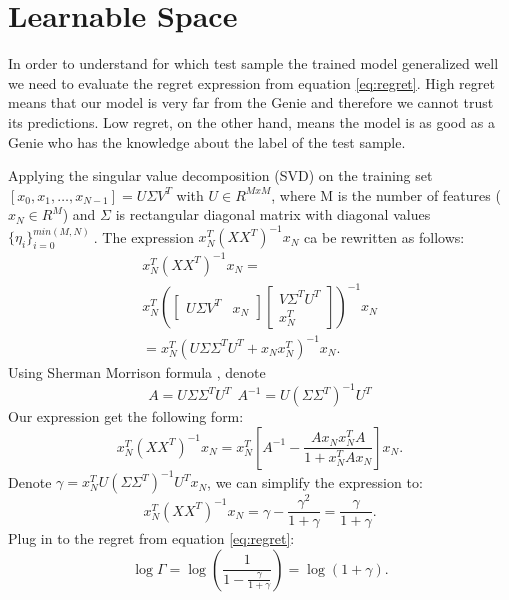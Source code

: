 \documentclass[conference,letterpaper]{IEEEtran}
\begin{document}
\section{Learnable Space} \label{sec:learnable_space}
In order to understand for which test sample the trained model generalized well we need to evaluate the regret expression from equation \ref{eq:regret}. High regret means that our model is very far from the Genie and therefore we cannot trust its predictions. Low regret, on the other hand, means the model is as good as a Genie who has the knowledge about the label of the test sample.

Applying the singular value decomposition (SVD) on the training set $[x_0,x_1, \hdots, x_{N-1}] = U \Sigma V^T$ with $U\in R^{MxM}$, where M is the number of features ($x_N \in R^M$) and $\Sigma$ is rectangular diagonal matrix with diagonal values $\{\eta_i\}_{i=0}^{min(M,N)} \ $. The expression $x_N^T(XX^T)^{-1}x_N$ ca be rewritten as follows:
\begin{multline}
x_N^T(XX^T)^{-1}x_N = \\
x_N^T\left(\begin{bmatrix} U \Sigma V^T & x_N \end{bmatrix}
\begin{bmatrix}
V \Sigma^T U^T \\ x_N^T
\end{bmatrix}
\right)^{-1}x_N \\
=  x_N^T\left(U \Sigma \Sigma^T U^T + x_N x_N^T\right)^{-1}x_N.
\end{multline}
Using Sherman Morrison formula \cite{press2007section}, denote 
\begin{equation}
A=U \Sigma \Sigma^T U^T \ \ A^{-1}=U (\Sigma \Sigma^T)^{-1} U^T   
\end{equation}
Our expression get the following form:
\begin{equation}
x_N^T(XX^T)^{-1}x_N = 
x_N^T \left[ A^{-1} -  \frac{ A x_N x_N^T  A}{1 + x_N^T  A x_N} \right] x_N.
\end{equation}
Denote $\gamma = x_N^T  U (\Sigma \Sigma^T)^{-1} U^T x_N$, we can simplify the expression to:
\begin{equation}
x_N^T(XX^T)^{-1}x_N = \gamma - \frac{\gamma^2}{1+\gamma} = \frac{\gamma}{1+\gamma}.
\end{equation}
Plug in to the regret from equation \ref{eq:regret}:
\begin{equation}
\log \Gamma = \log \left( \frac{1}{1-\frac{\gamma}{1+\gamma}} \right)
=  \log \left( 1+\gamma \right).
\end{equation}
\end{document}
